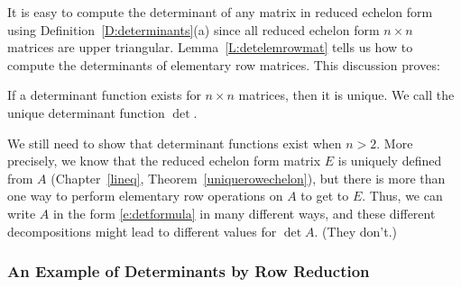 \documentclass{ximera}
\begin{document}
It is easy to compute the determinant of any matrix in reduced echelon 
form using Definition~\ref{D:determinants}(a) since all reduced echelon 
form $n\times n$ matrices are upper triangular.  Lemma~\ref{L:detelemrowmat}  
tells us how to compute the determinants of elementary row matrices.  This 
discussion proves: 
\begin{proposition}
If a determinant function exists for $n\times n$ matrices, then it is unique. 
We call the unique determinant function $\det$. 
\end{proposition}

We still need to show that determinant functions exist when $n>2$.  More 
precisely, we know that the reduced echelon form matrix $E$ is uniquely 
defined from $A$ (Chapter~\ref{lineq}, Theorem~\ref{uniquerowechelon}), but 
there is more than one way to perform elementary row operations on $A$ to 
get to $E$.  Thus, we can write $A$ in the form \eqref{e:detformula} in many 
different ways, and these different decompositions might lead to different 
values for $\det A$.  (They don't.)

\subsubsection*{An Example of Determinants by Row Reduction}
\end{document}
